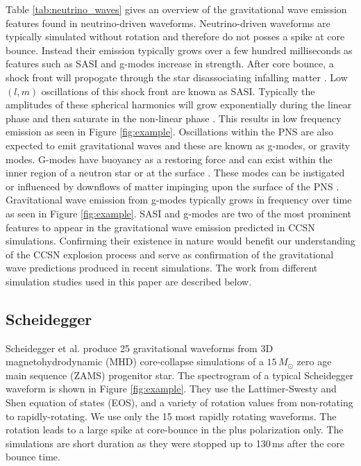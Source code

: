 \documentclass[letterpaper, aps, prd, twocolumn, superscriptaddress, showpacs, nofootinbib]{revtex4}
\begin{document}
Table \ref{tab:neutrino_waves} gives an overview of the gravitational wave emission features found in neutrino-driven waveforms. Neutrino-driven waveforms are typically simulated without rotation and therefore do not posses a spike at core bounce. Instead their emission typically grows over a few hundred milliseconds as features such as SASI and g-modes increase in strength. After core bounce, a shock front will propogate through the star disassociating infalling matter \cite{muller2016core}. Low $(l, m)$ oscillations of this shock front are known as SASI. Typically the amplitudes of these spherical harmonics will grow exponentially during the linear phase and then saturate in the non-linear phase \cite{hanke2013sasi}. This results in low frequency emission as seen in Figure \ref{fig:example}. Oscillations within the PNS are also expected to emit gravitational waves and these are known as g-modes, or gravity modes. G-modes have buoyancy as a restoring force and can exist within the inner region of a neutron star or at the surface \cite{andresen:16}. These modes can be instigated or influenced by downflows of matter impinging upon the surface of the PNS \cite{kuroda:16}. Gravitational wave emission from g-modes typically grows in frequency over time as seen in Figure \ref{fig:example}. SASI and g-modes are two of the most prominent features to appear in the gravitational wave emission predicted in CCSN simulations. Confirming their existence in nature would benefit our understanding of the CCSN explosion process and serve as confirmation of the gravitational wave predictions produced in recent simulations. The work from different simulation studies used in this paper are described below.

\subsection{Scheidegger}

Scheidegger et al. \cite{scheidegger:10b} produce 25 gravitational waveforms from 3D magnetohydrodynamic (MHD) core-collapse simulations of a $15\,M_{\odot}$ zero age main sequence (ZAMS) progenitor star. The spectrogram of a typical Scheidegger waveform is shown in Figure \ref{fig:example}. They use the Lattimer-Swesty and Shen equation of states (EOS), and a variety of rotation values from non-rotating to rapidly-rotating. We use only the 15 most rapidly rotating waveforms. The rotation leads to a large spike at core-bounce in the plus polarization only. The simulations are short duration as they were stopped up to 130\,ms after the core bounce time. 
\end{document}
